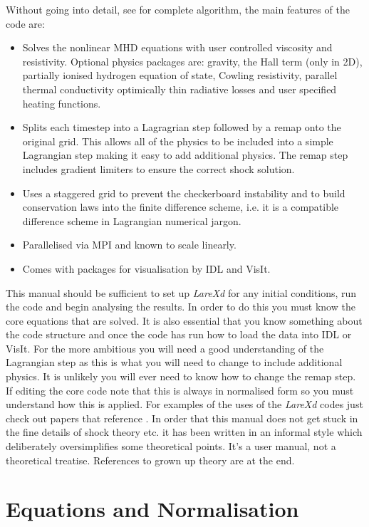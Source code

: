 \documentclass[11pt]{article}
\begin{document}
Without going into detail, see \cite{jcp} for complete algorithm, the main features of the code are:
\begin{itemize}
 \item Solves the nonlinear MHD equations with user controlled viscosity and resistivity. Optional physics packages are: gravity, the Hall term (only in 2D), partially ionised hydrogen equation of state, Cowling resistivity, parallel thermal conductivity optimically thin radiative losses and user specified heating functions.
 \item Splits each timestep into a Lagragrian step followed by a remap onto the original grid. This allows all of the physics to be included into a simple Lagrangian step making it easy to add additional physics. The remap step includes gradient limiters to ensure the correct shock solution.
 \item Uses a staggered grid to prevent the checkerboard instability and to build conservation laws into the finite difference scheme, i.e. it is a compatible difference scheme in Lagrangian numerical jargon.
 \item Parallelised via MPI and known to scale linearly.
 \item Comes with packages for visualisation by IDL and VisIt. \cite{visit}
\end{itemize}

This manual should be sufficient to set up {\it LareXd} for any initial conditions, run the code and begin analysing the results. In order to do this you must know the core equations that are solved. It is also essential that you know something about the code structure and once the code has run how to load the data into IDL or VisIt. For the more ambitious you will need a good understanding of the Lagrangian step as this is what you will need to change to include additional physics. It is unlikely you will ever need to know how to change the remap step. If editing the core code note that this is always in normalised form so you must understand how this is applied. For examples of the uses of the {\it LareXd} codes just check out papers that reference \cite{jcp}. In order that this manual does not get stuck in the fine details of shock theory etc. it has been written in an informal style which deliberately oversimplifies some theoretical points. It's a user manual, not a theoretical treatise. References to grown up theory are at the end.



\section{Equations and Normalisation}
\end{document}
